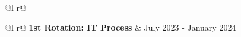 \documentclass[a4paper,10pt]{article}
\begin{document}
\begin{tabularx}{\linewidth}{ @{}l r@{} }
{\begin{minipage}[t]{\linewidth}
\begin{itemize}[nosep, leftmargin=1em, itemsep=3pt]
        \begin{tabularx}{\linewidth}{ @{}l r@{} }
            \textbf{1st Rotation: IT Process} &  \hfill July 2023 - January 2024 \\ 
\end{tabularx}
\end{itemize}
\end{minipage}}
\end{tabularx}
\end{document}

